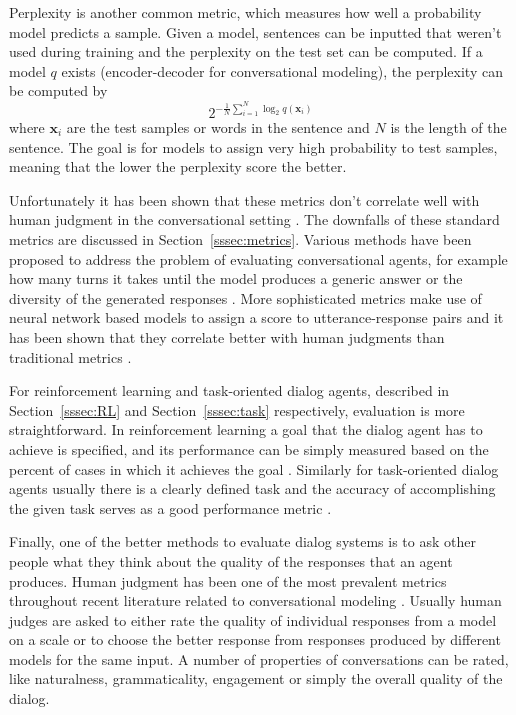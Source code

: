 \documentclass[12pt]{article}
\begin{document}
Perplexity \cite{Manning:1999} is another common metric, which measures how well a probability model predicts a sample. Given a model, sentences can be inputted that weren't used during training and the perplexity on the test set can be computed. If a model \(q\) exists (encoder-decoder for conversational modeling), the perplexity can be computed by
\begin{equation}
2^{-\frac{1}{N}\sum_{i=1}^{N}\log_2{q(\bm{x}_i)}}
\end{equation}
where \(\bm{x}_i\) are the test samples or words in the sentence and \(N\) is the length of the sentence. The goal is for models to assign very high probability to test samples, meaning that the lower the perplexity score the better.

Unfortunately it has been shown that these metrics don't correlate well with human judgment in the conversational setting \cite{Liu:2016}. The downfalls of these standard metrics are discussed in Section~\ref{sssec:metrics}. Various methods have been proposed to address the problem of evaluating conversational agents, for example how many turns it takes until the model produces a generic answer \cite{Zhao:2017,Li_RL:2016} or the diversity of the generated responses \cite{Li_RL:2016}. More sophisticated metrics make use of neural network based models to assign a score to utterance-response pairs and it has been shown that they correlate better with human judgments than traditional metrics \cite{Lowe:2017,Tao:2017}.

For reinforcement learning and task-oriented dialog agents, described in Section~\ref{sssec:RL} and Section~\ref{sssec:task} respectively, evaluation is more straightforward. In reinforcement learning a goal that the dialog agent has to achieve is specified, and its performance can be simply measured based on the percent of cases in which it achieves the goal \cite{Li_adversarial:2017,Havrylov:2017}. Similarly for task-oriented dialog agents usually there is a clearly defined task and the accuracy of accomplishing the given task serves as a good performance metric \cite{Joshi:2017,Zhao:2017,Li_HIL:2016}.

Finally, one of the better methods to evaluate dialog systems is to ask other people what they think about the quality of the responses that an agent produces. Human judgment has been one of the most prevalent metrics throughout recent literature related to conversational modeling \cite{Shang:2015,Vinyals:2015,Zhou:2017,Li_RL:2016,Zhao:2017,Li_RL:2016,Li:2015}. Usually human judges are asked to either rate the quality of individual responses from a model on a scale or to choose the better response from responses produced by different models for the same input. A number of properties of conversations can be rated, like naturalness, grammaticality, engagement or simply the overall quality of the dialog.
\end{document}
